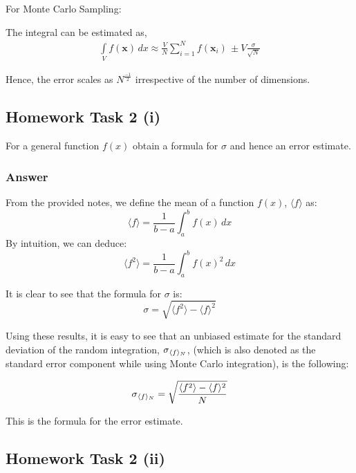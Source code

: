 \documentclass[12pt]{article}
\begin{document}
For Monte Carlo Sampling:

The integral can be estimated as,
 \begin{align} 
\int\limits_V f(\mathbf{x}) \, dx \approx \frac{V}{N}\sum_{i=1}^{N} f(\mathbf{x}_{i})\, \pm V\frac{\sigma}{\sqrt{N}}
\end{align}

Hence, the error scales as $N^{\frac{-1}{2}}$ irrespective of the number of dimensions. 

\subsection*{Homework Task 2 (i)}

For a general function $f(x)$ obtain a formula for $\sigma$ and hence an error estimate.

\subsubsection*{Answer}

From the provided notes, we define the mean of a function $f(x)$,  $\langle f\rangle$ as:
\begin{equation}
\langle f\rangle = \frac{1}{b-a}\int_{a}^{b} f(x) \,dx 
\end{equation}
By intuition, we can deduce:
\begin{equation}
\langle f^2\rangle = \frac{1}{b-a}\int_{a}^{b} f(x)^2 \,dx 
\end{equation}

It is clear to see that the formula for $\sigma$ is:
\begin{equation}
\sigma =  \sqrt{{\langle f^2\rangle} - {\langle f\rangle ^2}}
\end{equation}

Using these results, it is easy to see that an unbiased estimate for the standard deviation of the random integration, $\sigma\textsubscript{$\langle f\rangle$\textsubscript{$N$}}$, (which is also denoted as the standard error component while using Monte Carlo integration), is the following:

\begin{equation}
\sigma\textsubscript{$\langle f\rangle$\textsubscript{$N$}} = \sqrt{\frac{
\langle f^2\rangle - \langle f\rangle ^2 }{N}}
\end{equation}

This is the formula for the error estimate. 

\subsection*{Homework Task 2 (ii)}
\end{document}

